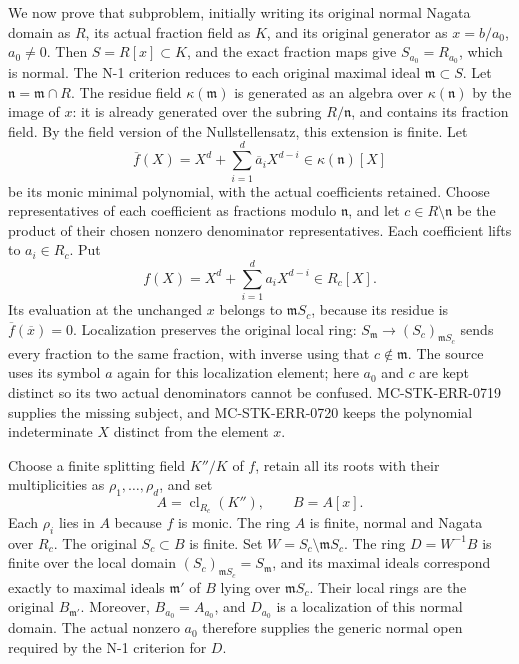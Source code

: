 We now prove that subproblem, initially writing its original normal Nagata domain as \(R\), its actual fraction field as \(K\), and its original generator as \(x=b/a_0\), \(a_0\ne0\). Then \(S=R[x]\subset K\), and the exact fraction maps give \(S_{a_0}=R_{a_0}\), which is normal. The N-1 criterion reduces to each original maximal ideal \(\mathfrak m\subset S\). Let \(\mathfrak n=\mathfrak m\cap R\). The residue field \(\kappa(\mathfrak m)\) is generated as an algebra over \(\kappa(\mathfrak n)\) by the image of \(x\): it is already generated over the subring \(R/\mathfrak n\), and contains its fraction field. By the field version of the Nullstellensatz, this extension is finite. Let \[
 \overline f(X)=X^d+\sum_{i=1}^{d}\overline a_iX^{d-i}
 \in\kappa(\mathfrak n)[X]
\] be its monic minimal polynomial, with the actual coefficients retained. Choose representatives of each coefficient as fractions modulo \(\mathfrak n\), and let \(c\in R\setminus\mathfrak n\) be the product of their chosen nonzero denominator representatives. Each coefficient lifts to \(a_i\in R_c\). Put \[
 f(X)=X^d+\sum_{i=1}^{d}a_iX^{d-i}\in R_c[X].
\] Its evaluation at the unchanged \(x\) belongs to \(\mathfrak mS_c\), because its residue is \(\overline f(\overline x)=0\). Localization preserves the original local ring: \(S_{\mathfrak m}\to(S_c)_{\mathfrak mS_c}\) sends every fraction to the same fraction, with inverse using that \(c\notin\mathfrak m\). The source uses its symbol \(a\) again for this localization element; here \(a_0\) and \(c\) are kept distinct so its two actual denominators cannot be confused. MC-STK-ERR-0719 supplies the missing subject, and MC-STK-ERR-0720 keeps the polynomial indeterminate \(X\) distinct from the element \(x\).

Choose a finite splitting field \(K''/K\) of \(f\), retain all its roots with their multiplicities as \(\rho_1,\ldots,\rho_d\), and set \[
 A=\operatorname{cl}_{R_c}(K''),\qquad B=A[x].
\] Each \(\rho_i\) lies in \(A\) because \(f\) is monic. The ring \(A\) is finite, normal and Nagata over \(R_c\). The original \(S_c\subset B\) is finite. Set \(W=S_c\setminus\mathfrak mS_c\). The ring \(D=W^{-1}B\) is finite over the local domain \((S_c)_{\mathfrak mS_c}=S_{\mathfrak m}\), and its maximal ideals correspond exactly to maximal ideals \(\mathfrak m'\) of \(B\) lying over \(\mathfrak mS_c\). Their local rings are the original \(B_{\mathfrak m'}\). Moreover, \(B_{a_0}=A_{a_0}\), and \(D_{a_0}\) is a localization of this normal domain. The actual nonzero \(a_0\) therefore supplies the generic normal open required by the N-1 criterion for \(D\).

